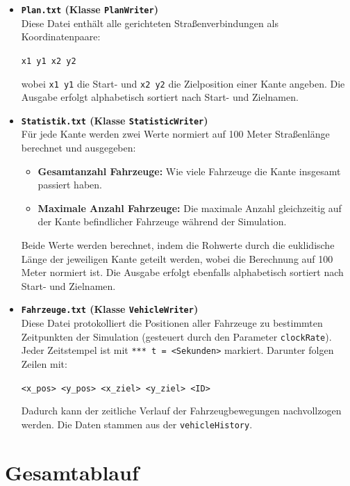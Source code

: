 \begin{itemize}
  \item \textbf{\texttt{Plan.txt} (Klasse \texttt{PlanWriter})} \\
  Diese Datei enthält alle gerichteten Straßenverbindungen als Koordinatenpaare:
  \begin{center}
    \texttt{x1 y1 x2 y2}
  \end{center}
  wobei \texttt{x1 y1} die Start- und \texttt{x2 y2} die Zielposition einer Kante angeben. Die Ausgabe erfolgt alphabetisch sortiert nach Start- und Zielnamen.

  \item \textbf{\texttt{Statistik.txt} (Klasse \texttt{StatisticWriter})} \\
  Für jede Kante werden zwei Werte normiert auf 100 Meter Straßenlänge berechnet und ausgegeben:
  \begin{itemize}
    \item \textbf{Gesamtanzahl Fahrzeuge:} Wie viele Fahrzeuge die Kante insgesamt passiert haben.
    \item \textbf{Maximale Anzahl Fahrzeuge:} Die maximale Anzahl gleichzeitig auf der Kante befindlicher Fahrzeuge während der Simulation.
  \end{itemize}
  Beide Werte werden berechnet, indem die Rohwerte durch die euklidische Länge der jeweiligen Kante geteilt werden, wobei die Berechnung auf 100 Meter normiert ist.
  Die Ausgabe erfolgt ebenfalls alphabetisch sortiert nach Start- und Zielnamen.

  \item \textbf{\texttt{Fahrzeuge.txt} (Klasse \texttt{VehicleWriter})} \\
  Diese Datei protokolliert die Positionen aller Fahrzeuge zu bestimmten Zeitpunkten der Simulation (gesteuert durch den Parameter \texttt{clockRate}). Jeder Zeitstempel ist mit \texttt{*** t = <Sekunden>} markiert. Darunter folgen Zeilen mit:
  \begin{center}
    \texttt{<x\_pos> <y\_pos> <x\_ziel> <y\_ziel> <ID>}
  \end{center}
  Dadurch kann der zeitliche Verlauf der Fahrzeugbewegungen nachvollzogen werden. Die Daten stammen aus der \texttt{vehicleHistory}.
\end{itemize}

\clearpage

\section{Gesamtablauf}

